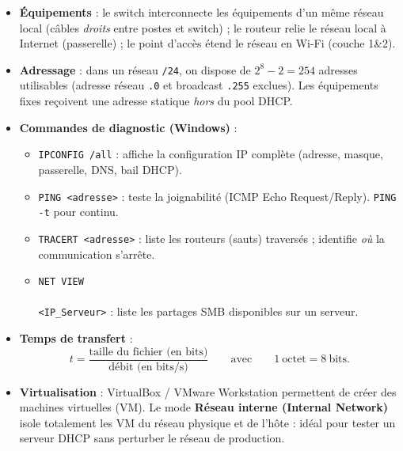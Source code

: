 \documentclass[11pt]{article}
\newcommand{\cle}[1]{{\popxbold\color{popdark}#1}}
\begin{document}
\begin{aretenir}
\begin{itemize}
\item \textbf{Équipements} : le \cle{switch} interconnecte les équipements d'un même réseau local (câbles \emph{droits} entre postes et switch) ; le \cle{routeur} relie le réseau local à Internet (passerelle) ; le \cle{point d'accès} étend le réseau en Wi-Fi (couche 1\&2).
\item \textbf{Adressage} : dans un réseau \texttt{/24}, on dispose de $2^8 - 2 = 254$ adresses utilisables (adresse réseau \texttt{.0} et broadcast \texttt{.255} exclues). Les équipements fixes reçoivent une adresse \cle{statique} \emph{hors} du pool DHCP.
\item \textbf{Commandes de diagnostic (Windows)} :
\begin{itemize}
\item \texttt{IPCONFIG /all} : affiche la configuration IP complète (adresse, masque, passerelle, DNS, bail DHCP).
\item \texttt{PING <adresse>} : teste la joignabilité (ICMP Echo Request/Reply). \texttt{PING -t} pour continu.
\item \texttt{TRACERT <adresse>} : liste les routeurs (sauts) traversés ; identifie \emph{où} la communication s'arrête.
\item \texttt{NET VIEW \\\\<IP\_Serveur>} : liste les partages SMB disponibles sur un serveur.
\end{itemize}
\item \textbf{Temps de transfert} :
\[ t = \dfrac{\text{taille du fichier (en bits)}}{\text{débit (en bits/s)}} \qquad \text{avec} \qquad 1~\text{octet} = 8~\text{bits}. \]
\item \textbf{Virtualisation} : VirtualBox / VMware Workstation permettent de créer des machines virtuelles (VM). Le mode \textbf{Réseau interne (Internal Network)} isole totalement les VM du réseau physique et de l'hôte : idéal pour tester un serveur DHCP sans perturber le réseau de production.
\end{itemize}
\end{aretenir}
\end{document}

